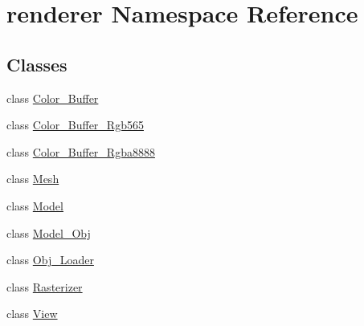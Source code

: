 \hypertarget{namespacerenderer}{}\section{renderer Namespace Reference}
\label{namespacerenderer}
\subsection*{Classes}
\begin{DoxyCompactItemize}
\item 
class \mbox{\hyperlink{classrenderer_1_1_color___buffer}{Color\+\_\+\+Buffer}}
\item 
class \mbox{\hyperlink{classrenderer_1_1_color___buffer___rgb565}{Color\+\_\+\+Buffer\+\_\+\+Rgb565}}
\item 
class \mbox{\hyperlink{classrenderer_1_1_color___buffer___rgba8888}{Color\+\_\+\+Buffer\+\_\+\+Rgba8888}}
\item 
class \mbox{\hyperlink{classrenderer_1_1_mesh}{Mesh}}
\item 
class \mbox{\hyperlink{classrenderer_1_1_model}{Model}}
\item 
class \mbox{\hyperlink{classrenderer_1_1_model___obj}{Model\+\_\+\+Obj}}
\item 
class \mbox{\hyperlink{classrenderer_1_1_obj___loader}{Obj\+\_\+\+Loader}}
\item 
class \mbox{\hyperlink{classrenderer_1_1_rasterizer}{Rasterizer}}
\item 
class \mbox{\hyperlink{classrenderer_1_1_view}{View}}
\end{DoxyCompactItemize}
